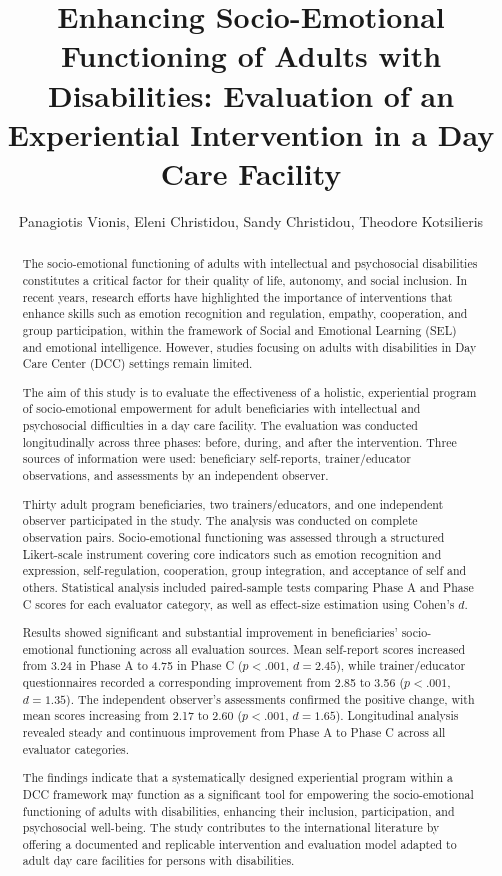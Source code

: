 \documentclass[journal]{IEEEtran}
\title{Enhancing Socio-Emotional Functioning of Adults with Disabilities: Evaluation of an Experiential Intervention in a Day Care Facility}
\author{
Panagiotis Vionis,
Eleni Christidou,
Sandy Christidou,
Theodore Kotsilieris
}
\begin{document}
\maketitle

\begin{abstract}
The socio-emotional functioning of adults with intellectual and psychosocial disabilities constitutes a critical factor for their quality of life, autonomy, and social inclusion. In recent years, research efforts have highlighted the importance of interventions that enhance skills such as emotion recognition and regulation, empathy, cooperation, and group participation, within the framework of Social and Emotional Learning (SEL) and emotional intelligence. However, studies focusing on adults with disabilities in Day Care Center (DCC) settings remain limited.

The aim of this study is to evaluate the effectiveness of a holistic, experiential program of socio-emotional empowerment for adult beneficiaries with intellectual and psychosocial difficulties in a day care facility. The evaluation was conducted longitudinally across three phases: before, during, and after the intervention. Three sources of information were used: beneficiary self-reports, trainer/educator observations, and assessments by an independent observer.

Thirty adult program beneficiaries, two trainers/educators, and one independent observer participated in the study. The analysis was conducted on complete observation pairs. Socio-emotional functioning was assessed through a structured Likert-scale instrument covering core indicators such as emotion recognition and expression, self-regulation, cooperation, group integration, and acceptance of self and others. Statistical analysis included paired-sample tests comparing Phase A and Phase C scores for each evaluator category, as well as effect-size estimation using Cohen's $d$.

Results showed significant and substantial improvement in beneficiaries' socio-emotional functioning across all evaluation sources. Mean self-report scores increased from 3.24 in Phase A to 4.75 in Phase C ($p < .001$, $d = 2.45$), while trainer/educator questionnaires recorded a corresponding improvement from 2.85 to 3.56 ($p < .001$, $d = 1.35$). The independent observer's assessments confirmed the positive change, with mean scores increasing from 2.17 to 2.60 ($p < .001$, $d = 1.65$). Longitudinal analysis revealed steady and continuous improvement from Phase A to Phase C across all evaluator categories.

The findings indicate that a systematically designed experiential program within a DCC framework may function as a significant tool for empowering the socio-emotional functioning of adults with disabilities, enhancing their inclusion, participation, and psychosocial well-being. The study contributes to the international literature by offering a documented and replicable intervention and evaluation model adapted to adult day care facilities for persons with disabilities.
\end{abstract}
\end{document}
